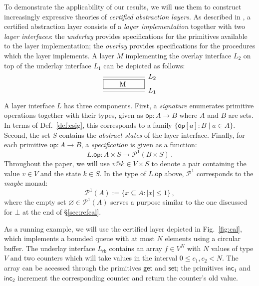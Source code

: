 \documentclass[draft,11pt]{report}
\newcommand{\kw}[1]{\ensuremath{ \mathsf{#1} }}
\begin{document}
To demonstrate the applicability of our results,
we will use them to construct
increasingly expressive theories of
\emph{certified abstraction layers}.
As described in \citet{popl15},
a certified abstraction layer
consists of a \emph{layer implementation} together with
two \emph{layer interfaces}:
the \emph{underlay} provides specifications for
the primitives available to the layer implementation;
the \emph{overlay} provides specifications for
the procedures which the layer implements.
A layer $M$ implementing the overlay interface $L_2$
on top of the underlay interface $L_1$ can be depicted as follows:
\[
  \begin{prooftree}
    \infer0[$L_2$]{\fbox{\qquad M \qquad}}
    \infer1[$L_1$]{}
  \end{prooftree}
\]

A layer interface $L$ has three components.
First, a \emph{signature} enumerates
primitive operations together with their types,
given as $\kw{op} : A \rightarrow B$
where $A$ and $B$ are sets.
In terms of Def.~\ref{def:esig},
this corresponds to a family $\{ \kw{op}[a] : B \mid a \in A \}$.
Second,
the set $S$ contains the \emph{abstract states} of the layer interface.
Finally, for each primitive
$\kw{op} : A \rightarrow B$,
a \emph{specification}
is given as a function:
\[
  L.\kw{op} : A \times S \rightarrow \mathcal{P}^1(B \times S) \,.
\]
Throughout the paper,
we will use $v@k \in V \times S$ to denote a pair
containing the value $v \in V$ and the state $k \in S$.
In the type of $L.\kw{op}$ above,
$\mathcal{P}^1$ corresponds to the \emph{maybe} monad:
\[
  \mathcal{P}^1(A) := \{ x \subseteq A : |x| \le 1 \} \,,
\]
where the empty set $\varnothing \in \mathcal{P}^1(A)$
serves a purpose similar to the one discussed for $\bot$
at the end of \S\ref{sec:refcal}.


As a running example,
we will use the certified layer
depicted in Fig.~\ref{fig:cal},
which implements a bounded queue with at most $N$ elements
using a circular buffer.
The underlay interface $L_\kw{rb}$
contains an array $f \in V^N$
with $N$ values of type $V$ and two counters
which will take values in the interval $0 \le c_1, c_2 < N$.
The array can be accessed through the primitives
$\kw{get}$ and $\kw{set}$;
the primitives $\kw{inc}_1$ and $\kw{inc}_2$
increment the corresponding counter
and return the counter's old value.
\end{document}
